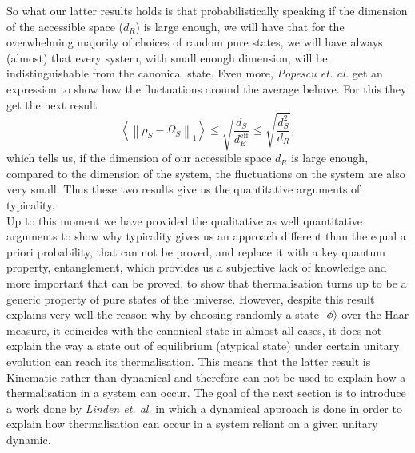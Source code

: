 \indent So what our latter results holds is that probabilistically speaking if the dimension of the accessible space ($d_R$) is large enough, we will have that for the overwhelming majority of choices of random pure states, we will have always (almost) that every system, with small enough dimension, will be indistinguishable from the canonical state. Even more, \textit{Popescu et. al.} get an expression to show how the fluctuations around the average behave. For this they get the next result
\begin{equation}
\left\langle\left\|\rho_{S}-\Omega_{S}\right\|_{1}\right\rangle \leq \sqrt{\frac{d_S}{d_E^{\mathrm{eff}}}}\leq\sqrt{\frac{d_{S}^{2}}{d_{R}}},
\label{CH1:Typicality_result_2}
\end{equation}
which tells us, if the dimension of our accessible space $d_R$ is large enough, compared to the dimension of the system, the fluctuations on the system are also very small. Thus these two results give us the quantitative arguments of typicality.\\

\indent Up to this moment we have provided the qualitative as well quantitative arguments to show why typicality gives us an approach different than the equal a priori probability, that can not be proved, and replace it with a key quantum property, entanglement, which provides us a subjective lack of knowledge and more important that can be proved, to show that thermalisation turns up to be a generic property of pure states of the universe. However, despite this result explains very well the reason why by choosing randomly a state $\mathinner{|{\phi}\rangle}$ over the Haar measure, it coincides with the canonical state in almost all cases, it does not explain the way a state out of equilibrium (atypical state) under certain unitary evolution can reach its thermalisation. This means that the latter result is Kinematic rather than dynamical and therefore can not be used to explain how a thermalisation in a system can occur. The goal of the next section is to introduce a work done by \textit{Linden et. al.} \cite{linden_quantum_2009} in which a dynamical approach is done in order to explain how thermalisation can occur in a system reliant on a given unitary dynamic.

